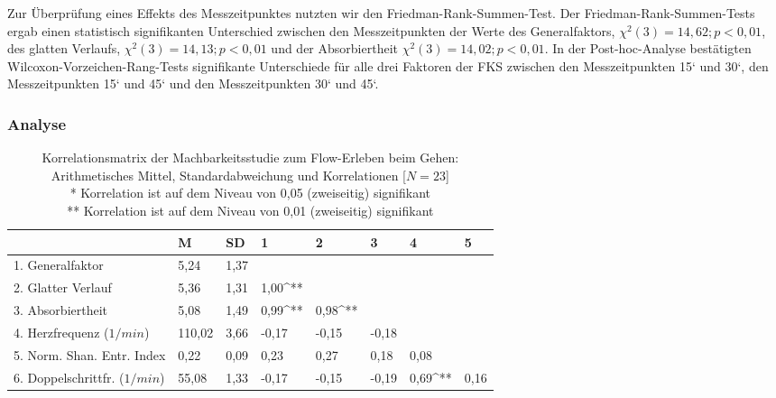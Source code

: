 Zur Überprüfung eines Effekts des Messzeitpunktes nutzten wir den Friedman-Rank-Summen-Test. Der Friedman-Rank-Summen-Tests ergab einen statistisch signifikanten Unterschied zwischen den Messzeitpunkten der Werte des Generalfaktors, $\chi^2 (3) = 14{,}62; p < 0{,}01$, des glatten Verlaufs, $\chi^2 (3) = 14{,}13; p < 0{,}01$ und der Absorbiertheit $\chi^2 (3) = 14{,}02; p < 0{,}01$. In der Post-hoc-Analyse bestätigten Wilcoxon-Vorzeichen-Rang-Tests signifikante Unterschiede für alle drei Faktoren der \ac{FKS} zwischen den Messzeitpunkten 15‘ und 30‘, den Messzeitpunkten 15‘ und 45‘ und den Messzeitpunkten 30‘ und 45‘. 

\subsubsection{Analyse} 

\label{subs:analyse_5_2} 
\begin{sidewaystable}
	\centering \caption[Korrelationsmatrix (Machbarkeitsstudie: Gehen)]{Korrelationsmatrix der Machbarkeitsstudie zum Flow-Erleben beim Gehen: Arithmetisches Mittel, Standardabweichung und Korrelationen [$N = 23$]\\
	\hspace{ 
	\textwidth}* Korrelation ist auf dem Niveau von 0,05 (zweiseitig) signifikant \\
	\hspace{ 
	\textwidth}** Korrelation ist auf dem Niveau von 0,01 (zweiseitig) signifikant} \label{tab:korrelationen_2} 
	\begin{tabular}
		{lxxxxxxx} \toprule & M & SD & 1 & 2 & 3 & 4 & 5 \\
		. Generalfaktor & 5,24 & 1,37 & & & & & \\
		2. Glatter Verlauf & 5,36 & 1,31 & 1,00^{**} & & & & \\
		3. Absorbiertheit & 5,08 & 1,49 & 0,99^{**} & 0,98^{**} & & & \\
		4. Herzfrequenz ($1/min$) & 110,02 & 3,66 & -0,17 & -0,15 & -0,18 & & \\
		5. Norm. Shan. Entr. Index & 0,22 & 0,09 & 0,23 & 0,27 & 0,18 & 0,08 & \\
		6. Doppelschrittfr. ($1/min$) & 55,08 & 1,33 & -0,17 & -0,15 & -0,19 & 0,69^{**} & 0,16 \\
		\bottomrule 
	\end{tabular}
\end{sidewaystable}

